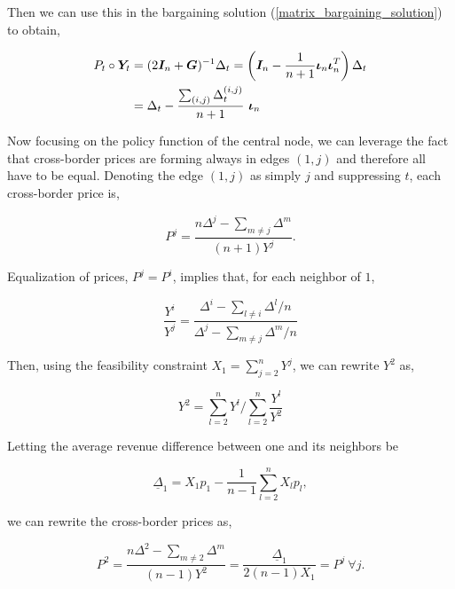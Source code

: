 Then we can use this in the bargaining solution (\ref{matrix_bargaining_solution}) to obtain,

\begin{equation*}
  \begin{split}
    P_t \circ \Y_t &= (2\I_n + \G)^{-1} \Delta_t = \left( \I_n - \frac{1}{n + 1} \matr{\iota}_n \matr{\iota}_n^T \right) \Delta_t \\
    &= \Delta_t - \frac{\sum_{(i, j)} \Delta^{(i, j)}_t}{n+1} \ \matr{\iota}_n
  \end{split}
\end{equation*}

Now focusing on the policy function of the central node, we can leverage the fact that cross-border prices are forming always in edges $(1, j)$ and therefore all have to be equal. Denoting the edge $(1, j)$ as simply $j$ and suppressing $t$, each cross-border price is,

\begin{equation*}
  P^j = \frac{n\Delta^j - \sum_{m \neq j} \Delta^m }{(n + 1)Y^j}.
\end{equation*}

Equalization of prices, $P^j = P^i$, implies that, for each neighbor of $1$,

\begin{equation*}
  \frac{Y^i}{Y^j} = \frac{\Delta^i - \sum_{l \neq i} \Delta^l / n}{\Delta^j - \sum_{m \neq j} \Delta^m / n}
\end{equation*}

Then, using the feasibility constraint $X_1 = \sum^n_{j = 2} Y^j$, we can rewrite $Y^2$ as,

\begin{equation*}
  Y^2 = \sum^n_{l = 2} Y^l \Big/ \sum^n_{l = 2} \frac{Y^l}{Y^2}
\end{equation*}

Letting the average revenue difference between one and its neighbors be

\begin{equation*}
  \underline{\Delta}_1 = X_1 p_1 - \frac{1}{n-1} \sum^n_{l = 2} X_l p_l,
\end{equation*}

we can rewrite the cross-border prices as,

\begin{equation*}
  P^2 = \frac{n \Delta^2 - \sum_{m \neq 2} \Delta^m}{(n-1) Y^2} = \frac{\underline{\Delta}_1}{2 (n-1) X_1} = P^j \ \forall j.
\end{equation*}

